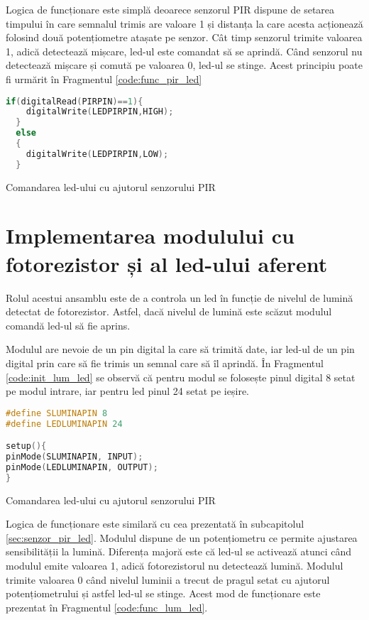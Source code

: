 Logica de funcționare este simplă deoarece senzorul PIR dispune de setarea timpului în care semnalul trimis are valoare 1 și distanța la care acesta acționează folosind două potențiometre atașate pe senzor. Cât timp senzorul trimite valoarea 1, adică detectează mișcare, led-ul este comandat să se aprindă. Când senzorul nu detectează mișcare și comută pe valoarea 0, led-ul se stinge. Acest principiu poate fi urmărit în Fragmentul \ref{code:func_pir_led}

\begin{code}[H]
\begin{lstlisting}[language=C++]
if(digitalRead(PIRPIN)==1){
    digitalWrite(LEDPIRPIN,HIGH);
  }
  else
  {
    digitalWrite(LEDPIRPIN,LOW);
  }
\end{lstlisting}
\caption{Comandarea led-ului cu ajutorul senzorului PIR}
\label{code:func_pir_led}
\end{code}

\section{Implementarea modulului cu fotorezistor și al led-ului aferent}
Rolul acestui ansamblu este de a controla un led în funcție de nivelul de lumină detectat de fotorezistor. Astfel, dacă nivelul de lumină este scăzut modulul comandă led-ul să fie aprins.

Modulul are nevoie de un pin digital la care să trimită date, iar led-ul de un pin digital prin care să fie trimis un semnal care să îl aprindă. În Fragmentul \ref{code:init_lum_led} se observă că pentru modul se folosește pinul digital 8 setat pe modul intrare, iar pentru led pinul 24 setat pe ieșire.

\begin{code}[H]
\begin{lstlisting}[language=C++]
#define SLUMINAPIN 8
#define LEDLUMINAPIN 24

setup(){
pinMode(SLUMINAPIN, INPUT);
pinMode(LEDLUMINAPIN, OUTPUT);
}
\end{lstlisting}
\caption{Comandarea led-ului cu ajutorul senzorului PIR}
\label{code:init_lum_led}
\end{code}

Logica de funcționare este similară cu cea prezentată în subcapitolul \ref{sec:senzor_pir_led}. Modulul dispune de un potențiometru ce permite ajustarea sensibilității la lumină. Diferența majoră este că led-ul se activează atunci când modulul emite valoarea 1, adică fotorezistorul nu detectează lumină. Modulul trimite valoarea 0 când nivelul luminii a trecut de pragul setat cu ajutorul potențiometrului și astfel led-ul se stinge. Acest mod de funcționare este prezentat în Fragmentul \ref{code:func_lum_led}.

